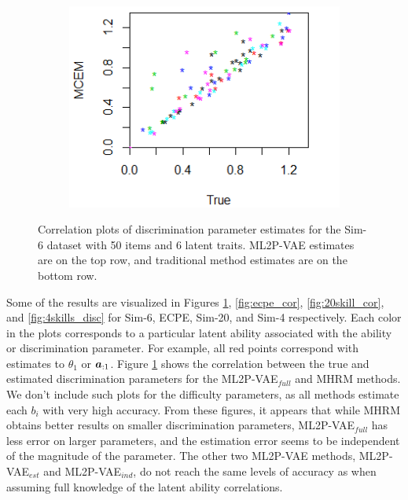 \begin{figure}[h]
\begin{subfigure}{.32\textwidth}
    \end{subfigure}
    \begin{subfigure}{.32\textwidth}
      \centering
      \includegraphics[width=.9\linewidth]{img/ml_journal_results/6skills/mcem_disc_6skills.png}
    \end{subfigure}
    \caption{Correlation plots of discrimination parameter estimates for the Sim-6 dataset with 50 items and 6 latent traits. ML2P-VAE estimates are on the top row, and traditional method estimates are on the bottom row.}
    \label{fig:6skill_cor}
\end{figure}

Some of the results are visualized in Figures \ref{fig:6skill_cor}, \ref{fig:ecpe_cor}, \ref{fig:20skill_cor}, and \ref{fig:4skills_disc} for Sim-6, ECPE, Sim-20, and Sim-4 respectively. Each color in the plots corresponds to a particular latent ability associated with the ability or discrimination parameter. For example, all red points correspond with estimates to $\theta_1$ or $\boldsymbol{a}_{:1}$. Figure \ref{fig:6skill_cor} shows the correlation between the true and estimated discrimination parameters for the ML2P-VAE$_{full}$ and MHRM methods. We don't include such plots for the difficulty parameters, as all methods estimate each $b_i$ with very high accuracy. From these figures, it appears that while MHRM obtains better results on smaller discrimination parameters, ML2P-VAE$_{full}$ has less error on larger parameters, and the estimation error seems to be independent of the magnitude of the parameter. The other two ML2P-VAE methods, ML2P-VAE$_{est}$ and ML2P-VAE$_{ind}$, do not reach the same levels of accuracy as when assuming full knowledge of the latent ability correlations. 

